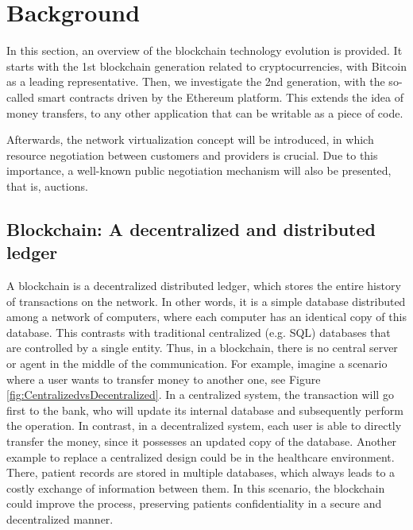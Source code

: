 \chapter{Background}
\label{ch:background}

In this section, an overview of the blockchain technology evolution is provided. It starts with the 1st blockchain generation related to cryptocurrencies, with Bitcoin as a leading representative. Then, we investigate the 2nd generation, with the so-called smart contracts driven by the Ethereum platform. This extends the idea of money transfers, to any other application that can be writable as a piece of code.

Afterwards, the network virtualization concept will be introduced, in which resource negotiation between customers and providers is crucial. Due to this importance, a well-known public negotiation mechanism will also be presented, that is, auctions.

\section{Blockchain: A decentralized and distributed ledger}

A blockchain is a decentralized distributed ledger, which stores the entire history of transactions on the network. In other words, it is a simple database distributed among a network of computers, where each computer has an identical copy of this database. This contrasts with traditional centralized (e.g. SQL) databases that are controlled by a single entity. Thus, in a blockchain, there is no central server or agent in the middle of the communication. For example, imagine a scenario where a user wants to transfer money to another one, see Figure \ref{fig:CentralizedvsDecentralized}. In a centralized system, the transaction will go first to the bank, who will update its internal database and subsequently perform the operation. In contrast, in a decentralized system, each user is able to directly transfer the money, since it possesses an updated copy of the database. Another example to replace a centralized design could be in the healthcare environment. There, patient records are stored in multiple databases, which always leads to a costly exchange of information between them. In this scenario, the blockchain could improve the process, preserving patients confidentiality in a secure and decentralized manner.

